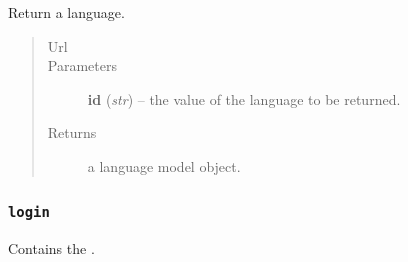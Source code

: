 \documentclass[letterpaper,10pt,english]{sphinxmanual}
\begin{document}
\begin{fulllineitems}

\begin{fulllineitems}
\label{api:onlinelinguisticdatabase.controllers.languages.LanguagesController.show}
Return a language.
\begin{quote}\begin{description}
\item[{Url }] \leavevmode
{}

\item[{Parameters}] \leavevmode
\textbf{id} (\emph{str}) -- the  value of the language to be returned.

\item[{Returns}] \leavevmode
a language model object.

\end{description}\end{quote}

\end{fulllineitems}


\end{fulllineitems}



\subsubsection{\texttt{login}}
\label{api:module-onlinelinguisticdatabase.controllers.login}\label{api:login}
Contains the {\hyperref[api:onlinelinguisticdatabase.controllers.login.LoginController]{}}.
\label{api:module-login}
\end{document}
